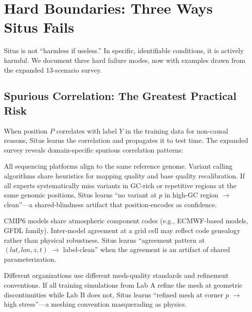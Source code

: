 \documentclass[12pt,a4paper]{article}
\begin{document}
\section{Hard Boundaries: Three Ways Situs Fails}
\label{sec:hard}

Situs is not ``harmless if useless.'' In specific, identifiable conditions, it is actively harmful. We document three hard failure modes, now with examples drawn from the expanded 13-scenario survey.

\subsection{Spurious Correlation: The Greatest Practical Risk}
\label{sec:spurious}

When position $P$ correlates with label $Y$ in the training data for non-causal reasons, Situs learns the correlation and propagates it to test time. The expanded survey reveals domain-specific spurious correlation patterns:

\begin{description}[leftmargin=1.5cm]
\item[\textbf{Genomics — reference genome bias}.] All sequencing platforms align to the same reference genome. Variant calling algorithms share heuristics for mapping quality and base quality recalibration. If all experts systematically miss variants in GC-rich or repetitive regions at the same genomic positions, Situs learns ``no variant at $p$ in high-GC region $\to$ clean''—a shared-blindness artifact that position-encodes as confidence.
\item[\textbf{Climate — model genealogy confounding}.] CMIP6 models share atmospheric component codes (e.g., ECMWF-based models, GFDL family). Inter-model agreement at a grid cell may reflect code genealogy rather than physical robustness. Situs learns ``agreement pattern at $(lat,lon,z,t)$ $\to$ label-clean'' when the agreement is an artifact of shared parameterization.
\item[\textbf{Engineering — mesh convention artifact}.] Different organizations use different mesh-quality standards and refinement conventions. If all training simulations from Lab A refine the mesh at geometric discontinuities while Lab B does not, Situs learns ``refined mesh at corner $p$ $\to$ high stress''—a meshing convention masquerading as physics.
\end{description}
\end{document}
